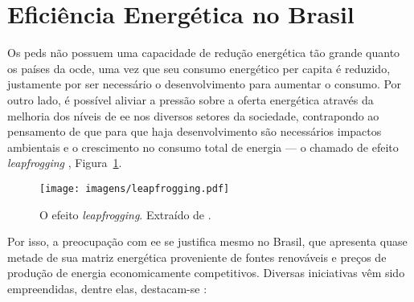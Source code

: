 \section{Eficiência Energética no Brasil}
\label{sec:ee_brasil}

Os \glspl{ped} não possuem uma capacidade de redução energética tão grande
quanto os países da \gls{ocde}, uma vez que seu consumo energético per capita é
reduzido, justamente por ser necessário o desenvolvimento para aumentar o
consumo. Por outro lado, é possível aliviar a pressão sobre a
oferta energética através da melhoria dos níveis de \gls{ee} nos
diversos setores da sociedade, contrapondo ao pensamento de que para que
haja desenvolvimento são necessários impactos ambientais e o crescimento no
consumo total de energia --- o chamado de efeito \emph{leapfrogging}
\cite{goldemberg}, Figura~\ref{fig:leapfrogging}.

\begin{figure}[h!t]
\centering
\texttt{[image: imagens/leapfrogging.pdf]}
\caption[O efeito \emph{leapfrogging}.]
{O efeito \emph{leapfrogging}. Extraído de \cite{goldemberg}.}
\label{fig:leapfrogging}
\end{figure}

Por isso, a preocupação com \gls{ee} se justifica mesmo no Brasil,
que apresenta quase metade de sua matriz energética proveniente de fontes
renováveis e preços de produção de energia economicamente competitivos.
Diversas iniciativas vêm sido empreendidas, dentre elas, destacam-se
\cite{pnef,pne30_eff_energ,epe_demanda_2012,epe_slides_eficiencia}:

